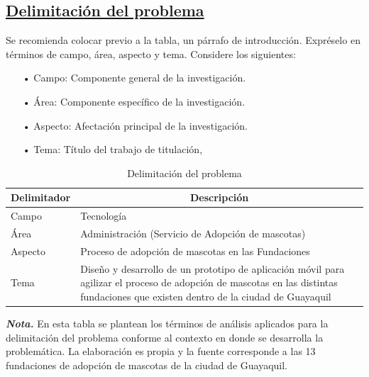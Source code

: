 \documentclass[12pt, a4paper, nofontenc, numbers=endperiod]{apa7}
\begin{document}
{{		\subsection*{\normalsize  \underline{Delimitación del problema}} 
		\setlength{\parindent}{1.27cm}Se recomienda colocar previo a la tabla, un párrafo de introducción. Expréselo en términos de campo, área, aspecto y tema. Considere los siguientes:
	}
	\newpage
	\restoregeometry	
{\doublespacing
\begin{itemize}[leftmargin=1.70cm]
		\item[•] Campo: Componente general de la investigación. 
		\item[•] Área: Componente específico de la investigación. 
		\item[•] Aspecto: Afectación principal de la investigación. 
		\item[•] Tema: Título del trabajo de titulación,
\end{itemize}
}

	\begin{table}[h]
		\caption{Delimitación del problema}
		\label{Tabla1} %

		{\renewcommand{\arraystretch}{1.5} 
			\begin{tabular}{p{6cm}p{9.1cm}}
				\toprule
				\multicolumn{1}{c}{Delimitador} &  \multicolumn{1}{c}{Descripción} \\
				\midrule
				Campo & Tecnología \\
				
				Área &  Administración (Servicio de Adopción de mascotas) \\
				
				Aspecto &  Proceso de adopción de mascotas en las Fundaciones \\
				
				Tema & Diseño y desarrollo de un prototipo de aplicación móvil para agilizar el proceso de adopción de mascotas en las distintas fundaciones que existen dentro de la ciudad de Guayaquil
				\\ \midrule
			\end{tabular}
		\begin{tablenotes}[para,flushleft]
			{\small
				\textit{\textbf{Nota.}} En esta tabla se plantean los términos de análisis aplicados para la delimitación del problema conforme al contexto en donde se desarrolla la problemática. La elaboración es propia y la fuente corresponde a las 13 fundaciones de adopción de mascotas de la ciudad de Guayaquil.
			}
		\end{tablenotes}
		}
	\end{table}
		\vspace*{-1cm}
}
\end{document}

